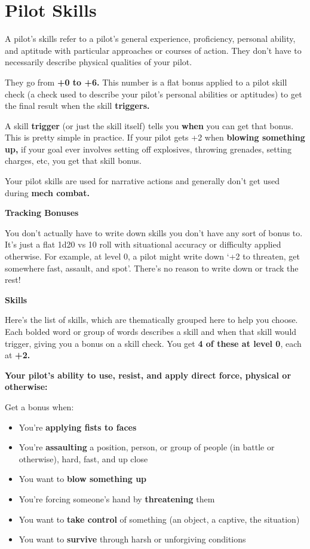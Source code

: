 \section{Pilot Skills}

A pilot's skills refer to a pilot's general experience, proficiency, personal ability, and aptitude with
particular approaches or courses of action. They don't have to necessarily describe physical
qualities of your pilot.

They go from \textbf{+0 to +6.} This number is a flat bonus applied to a pilot skill check (a check used to
describe your pilot's personal abilities or aptitudes) to get the final result
when the skill \textbf{triggers.} 

A skill \textbf{trigger} (or just the skill itself) tells you \textbf{when} you can get that bonus. This is pretty simple in
practice. If your pilot gets +2 when \textbf{blowing something up,} if your goal ever involves setting off
explosives, throwing grenades, setting charges, etc, you get that skill bonus.

Your pilot skills are used for narrative actions and generally don't get used during \textbf{mech combat.} 

\begin{center}
\textbf{Tracking Bonuses}
\end{center}


You don't actually have to write down skills you don't have any sort of bonus to. It's just a flat
1d20 vs 10 roll with situational accuracy or difficulty applied otherwise. For example, at level 0, a
pilot might write down `+2 to threaten, get somewhere fast, assault, and spot'. There's no reason
to write down or track the rest!


\begin{center}
\textbf{Skills}
\end{center}

Here's the list of skills, which are thematically grouped here to help you choose. Each bolded
word or group of words describes a skill and when that skill would trigger, giving you a bonus on a
skill check. You get \textbf{4 of these at level 0}, each at \textbf{+2.} 

\textbf{Your pilot's ability to use, resist, and apply direct force, physical or otherwise:}

Get a bonus when: 
\begin{itemize}
\item You're \textbf{applying fists to faces} 
\item You're \textbf{assaulting} a position, person, or group of people (in battle or otherwise), hard, fast, and up close
\item You want to \textbf{blow something up}
\item You're forcing someone's hand by \textbf{threatening} them
\item You want to \textbf{take control} of something (an object, a captive, the situation)
\item You want to \textbf{survive} through harsh or unforgiving conditions
\end{itemize}  


